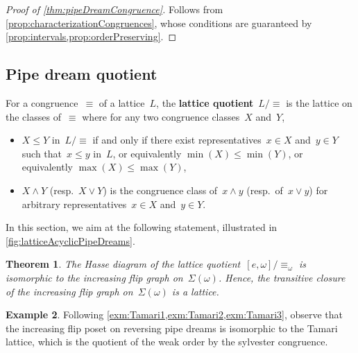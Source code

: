 \documentclass[reqno]{amsart}
\newtheorem{theorem}{Theorem}[section]
\theoremstyle{definition}
\newtheorem{example}[theorem]{Example}
\newcommand{\defn}[1]{\textbf{\textsf{\color{PineGreen} #1}}} %
\newcommand{\acyclicPipeDreams}{\Sigma} %
\newcommand{\meet}{\wedge} %
\newcommand{\join}{\vee} %
\begin{document}
\begin{proof}[Proof of \cref{thm:pipeDreamCongruence}]
Follows from \cref{prop:characterizationCongruences}, whose conditions are guaranteed by \cref{prop:intervals,prop:orderPreserving}.
\end{proof}


\subsection{Pipe dream quotient}
\label{subsec:pipeDreamQuotient}

For a congruence~$\equiv$ of a lattice~$L$, the \defn{lattice quotient}~$L/{\equiv}$ is the lattice on the classes of~$\equiv$ where for any two congruence classes~$X$ and~$Y$, 
\begin{itemize}
\item $X \le Y$ in~$L/{\equiv}$ if and only if there exist representatives~$x \in X$ and~$y \in Y$ such that~$x \le y$ in~$L$, or equivalently $\min(X) \le \min(Y)$, or equivalently $\max(X) \le \max(Y)$,
\item $X \meet Y$ (resp.~$X \join Y$) is the congruence class of~$x \meet y$ (resp.~of~$x \join y$) for arbitrary representatives~$x \in X$ and~$y \in Y$.
\end{itemize}
In this section, we aim at the following statement, illustrated in \cref{fig:latticeAcyclicPipeDreams}.

\begin{theorem}
\label{thm:pipeDreamQuotient}
The Hasse diagram of the lattice quotient~$[e,\omega]/{\equiv_\omega}$ is isomorphic to the increasing flip graph on~$\acyclicPipeDreams(\omega)$.
Hence, the transitive closure of the increasing flip graph on~$\acyclicPipeDreams(\omega)$ is a lattice.
\end{theorem}

\begin{example}
\label{exm:Tamari4}
Following \cref{exm:Tamari1,exm:Tamari2,exm:Tamari3}, observe that the increasing flip poset on reversing pipe dreams is isomorphic to the Tamari lattice, which is the quotient of the weak order by the sylvester congruence.
\end{example}
\end{document}
